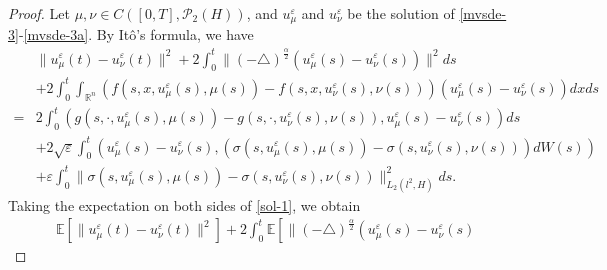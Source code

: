 \documentclass[11pt]{article}
\numberwithin{equation}{section}
\theoremstyle{plain}
\begin{document}
\begin{proof}
 Let $\mu, \nu \in C( [0,T], \mathcal{P}_2(H) )$,
 and $u_\mu^\varepsilon$ and $u_\nu^\varepsilon$ be the solution of \eqref{mvsde-3}-\eqref{mvsde-3a}.
By It\^{o}'s formula, we have
\begin{align}\label{sol-1}
       & \| u_\mu^\varepsilon(t) - u_\nu^\varepsilon(t) \|^2
         + 2 \int_0^t
                  \| (-\triangle)^{\frac{\alpha}{2}}
                           \left( u_\mu^\varepsilon(s)
                                  - u_\nu^\varepsilon(s)
                           \right)
                  \|^2 ds  \nonumber \\
       & + 2 \int_0^t \int_{\mathbb{R}^n}
                   \left( f(s, x, u_\mu^\varepsilon (s) , \mu(s) )
                          - f(s, x, u_\nu^\varepsilon (s), \nu(s) )
                   \right)
                   \left( u_\mu^\varepsilon (s)
                          - u_\nu^\varepsilon (s)
                   \right) dx ds
                         \nonumber \\
     = & 2 \int_0^t
                   \left( g(s, \cdot, u_\mu^\varepsilon (s), \mu(s) )
                           - g(s, \cdot, u_\nu^\varepsilon (s), \nu(s) ),
                          u_\mu^\varepsilon (s)
                           - u_\nu^\varepsilon (s)
                   \right) ds
                             \nonumber \\
       & + 2 \sqrt{\varepsilon}
                \int_0^t
                  \left( u_\mu^\varepsilon (s)
                          - u_\nu^\varepsilon (s),
                         \left( \sigma(s, u_\mu^\varepsilon (s), \mu(s) )
                                - \sigma(s, u_\nu^\varepsilon (s), \nu(s) )
                         \right) dW(s)
                  \right)
                  \nonumber \\
       & + \varepsilon
                \int_0^t
                  \| \sigma(s, u_\mu^\varepsilon (s), \mu(s) )
                      - \sigma(s, u_\nu^\varepsilon (s), \nu(s) )
                  \|_{L_{2}(l^2,H)}^2 ds.
\end{align}
 Taking
 the  expectation on both sides
 of  \eqref{sol-1}, we obtain
\begin{align}\label{sol-2}
      & \mathbb{E}
          \left[ \| u_\mu^\varepsilon(t) - u_\nu^\varepsilon(t) \|^2
          \right]
        + 2 \int_0^t
                 \mathbb{E}
                         \left[
                                \| (-\triangle)^{\frac{\alpha}{2}}
                                    \left( u_\mu^\varepsilon(s)
                                           - u_\nu^\varepsilon(s)

\end{align}
\end{proof}
\end{document}
